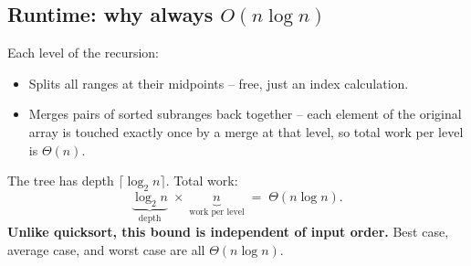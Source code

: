 \documentclass[11pt]{article}
\begin{document}
\subsection{Runtime: why always $O(n \log n)$}

\begin{ideabox}
Each level of the recursion:
\begin{itemize}[leftmargin=*]
  \item Splits all ranges at their midpoints -- free, just an
        index calculation.
  \item Merges pairs of sorted subranges back together -- each
        element of the original array is touched exactly once by a
        merge at that level, so total work per level is $\Theta(n)$.
\end{itemize}
The tree has depth $\lceil \log_2 n \rceil$. Total work:
\[
    \underbrace{\log_2 n}_{\text{depth}} \;\times\; \underbrace{n}_{\text{work per level}}
    \;=\; \Theta(n \log n).
\]
\textbf{Unlike quicksort, this bound is independent of input order.}
Best case, average case, and worst case are all $\Theta(n \log n)$.
\end{ideabox}
\end{document}
